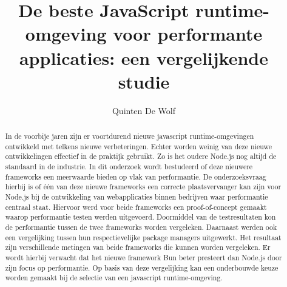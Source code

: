 \documentclass[a0,portrait]{hogent-poster}
\title{De beste JavaScript runtime-omgeving voor performante applicaties: een vergelijkende studie}
\author{Quinten De Wolf}
\begin{document}
\maketitle

\begin{abstract}
In de voorbije jaren zijn er voortdurend nieuwe javascript runtime-omgevingen ontwikkeld met telkens nieuwe verbeteringen. 
Echter worden weinig van deze nieuwe ontwikkelingen effectief in de praktijk gebruikt.
Zo is het oudere Node.js nog altijd de standaard in de industrie. 
In dit onderzoek wordt bestudeerd of deze nieuwere frameworks een meerwaarde bieden op vlak van performantie.
De onderzoeksvraag hierbij is of één van deze nieuwe frameworks  
een correcte plaatsvervanger kan zijn voor Node.js bij de ontwikkeling van webapplicaties binnen bedrijven 
waar performantie centraal staat.
Hiervoor werd voor beide frameworks een proof-of-concept gemaakt waarop performantie testen werden uitgevoerd.
Doormiddel van de testresultaten kon de performantie tussen de twee frameworks worden vergeleken.
Daarnaast werden ook een vergelijking tussen hun respectievelijke package managers uitgewerkt. 
Het resultaat zijn verschillende metingen van beide frameworks die kunnen worden vergeleken.
Er wordt hierbij verwacht dat het nieuwe framework Bun beter presteert dan Node.js door zijn focus op performantie.
Op basis van deze vergelijking kan een onderbouwde keuze worden gemaakt bij de selectie van een javascript runtime-omgeving.
\end{abstract}
\end{document}
